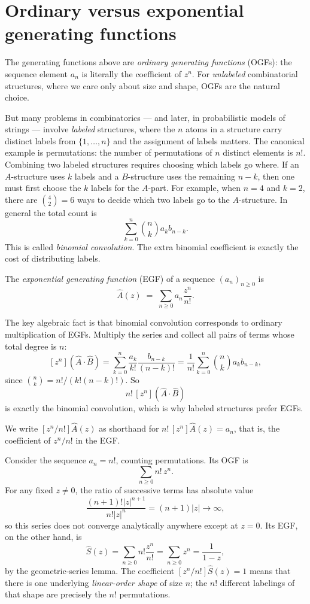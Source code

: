 \section*{Ordinary versus exponential generating functions}

The generating functions above are \emph{ordinary generating functions} (OGFs): the sequence element $a_n$ is literally the coefficient of $z^n$. For \emph{unlabeled} combinatorial structures, where we care only about size and shape, OGFs are the natural choice.

But many problems in combinatorics --- and later, in probabilistic models of strings --- involve \emph{labeled} structures, where the $n$ atoms in a structure carry distinct labels from $\{1,\dots,n\}$ and the assignment of labels matters. The canonical example is permutations: the number of permutations of $n$ distinct elements is $n!$. Combining two labeled structures requires choosing which labels go where. If an $A$-structure uses $k$ labels and a $B$-structure uses the remaining $n-k$, then one must first choose the $k$ labels for the $A$-part. For example, when $n=4$ and $k=2$, there are $\binom{4}{2}=6$ ways to decide which two labels go to the $A$-structure. In general the total count is
\[
  \sum_{k=0}^n \binom{n}{k} a_k b_{n-k}.
\]
This is called \emph{binomial convolution}. The extra binomial coefficient is exactly the cost of distributing labels.

\begin{definition}
The \emph{exponential generating function} (EGF) of a sequence $(a_n)_{n \ge 0}$ is
\[
  \hat{A}(z) \;=\; \sum_{n \ge 0} a_n \frac{z^n}{n!}.
\]
\end{definition}

The key algebraic fact is that binomial convolution corresponds to ordinary multiplication of EGFs. Multiply the series and collect all pairs of terms whose total degree is $n$:
\[
  [z^n](\hat{A}\cdot\hat{B})
  = \sum_{k=0}^n \frac{a_k}{k!}\frac{b_{n-k}}{(n-k)!}
  = \frac{1}{n!}\sum_{k=0}^n \binom{n}{k}a_k b_{n-k},
\]
since $\binom{n}{k}=n!/(k!(n-k)!)$. So
\[
  n!\,[z^n](\hat{A}\cdot\hat{B})
\]
is exactly the binomial convolution, which is why labeled structures prefer EGFs.

We write $[z^n/n!]\hat{A}(z)$ as shorthand for $n!\,[z^n]\hat{A}(z)=a_n$, that is, the coefficient of $z^n/n!$ in the EGF.

\begin{example}
Consider the sequence $a_n=n!$, counting permutations. Its OGF is
\[
  \sum_{n \ge 0} n! \, z^n.
\]
For any fixed $z \ne 0$, the ratio of successive terms has absolute value
\[
  \frac{(n+1)!|z|^{n+1}}{n!|z|^n} = (n+1)|z| \to \infty,
\]
so this series does not converge analytically anywhere except at $z=0$. Its EGF, on the other hand, is
\[
  \hat{S}(z)
  = \sum_{n \ge 0} n!\frac{z^n}{n!}
  = \sum_{n \ge 0} z^n
  = \frac{1}{1-z},
\]
by the geometric-series lemma. The coefficient $[z^n/n!]\hat{S}(z)=1$ means that there is one underlying \emph{linear-order shape} of size $n$; the $n!$ different labelings of that shape are precisely the $n!$ permutations.
\end{example}

